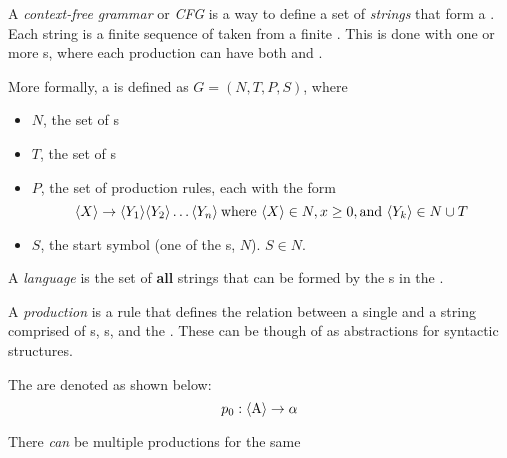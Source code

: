 \begin{definition}\label{def:Context_Free_Grammar}
  A \emph{context-free grammar} or \emph{CFG} is a way to define a set of \textit{strings} that form a .
  Each string is a finite sequence of  taken from a finite .
  This is done with one or more s, where each production can have both  and .

  More formally, a  is defined as $G = (N, T, P, S)$, where
  \begin{itemize}[noitemsep]
  \item $N$, the set of s
  \item $T$, the set of s
  \item $P$, the set of production rules, each with the form
    \begin{equation*}
      \langle X \rangle \rightarrow \langle Y_{1} \rangle \langle Y_{2} \rangle \ldots \langle Y_{n} \rangle \: \text{where } \langle X \rangle \in N, x \geq 0, \text{and } \langle Y_{k} \rangle \in N \cup T
    \end{equation*}
  \item $S$, the start symbol (one of the s, $N$). $S \in N$.
  \end{itemize}
\end{definition}

\begin{definition}[Language]\label{def:Language}
  A \emph{language} is the set of \textbf{\textup{all}} strings that can be formed by the s in the .
\end{definition}

\begin{definition}[Production]\label{def:Production}
  A \emph{production} is a rule that defines the relation between a single  and a string comprised of s, s, and the .
  These can be though of as abstractions for syntactic structures.

  The are denoted as shown below:
  \begin{equation}\label{eq:Production}
    p_{0}: \langle \text{A} \rangle \rightarrow \alpha
  \end{equation}

  \begin{remark}
    There \emph{can} be multiple productions for the same 
  \end{remark}
\end{definition}

